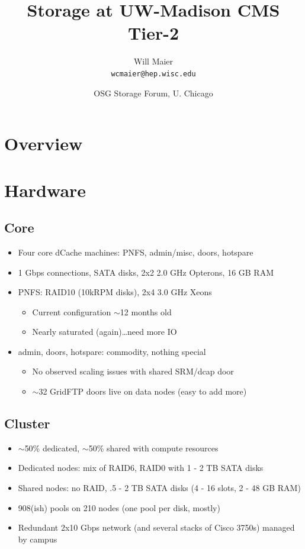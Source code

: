 \documentclass{beamer}
\title{Storage at UW-Madison CMS Tier-2}
\author[Maier]{
    Will Maier \\ 
    {\tt wcmaier@hep.wisc.edu}}
\institute[Wisconsin]{University of Wisconsin - High Energy Physics}
\date[2010.09.22]{OSG Storage Forum, U. Chicago}
\newcommand{\ca}{\ensuremath{\sim}}
\begin{document}

\begin{frame}
    \titlepage
\end{frame}

\section{Overview}
\begin{frame}
    \tableofcontents
\end{frame}

\section{Hardware}
\subsection{Core}
\begin{frame}
\begin{itemize}
	\item Four core dCache machines: PNFS, admin/misc, doors, hotspare
	\item 1 Gbps connections, SATA disks, 2x2 2.0 GHz Opterons, 16 GB RAM
	\item PNFS: RAID10 (10kRPM disks), 2x4 3.0 GHz Xeons
	\begin{itemize}
		\item Current configuration \ca{}12 months old
		\item Nearly saturated (again)\ldots{}need more IO
	\end{itemize}
	\item admin, doors, hotspare: commodity, nothing special
	\begin{itemize}
		\item No observed scaling issues with shared SRM/dcap door
		\item \ca{}32 GridFTP doors live on data nodes (easy to add more)
	\end{itemize}
\end{itemize}
\end{frame}

\subsection{Cluster}
\begin{frame}
\begin{itemize}
	\item \ca{}50\% dedicated, \ca{}50\% shared with compute resources
	\item Dedicated nodes: mix of RAID6, RAID0 with 1 - 2 TB SATA disks
	\item Shared nodes: no RAID, .5 - 2 TB SATA disks (4 - 16 slots, 2 - 48 GB RAM)
	\item 908(ish) pools on 210 nodes (one pool per disk, mostly)
	\item Redundant 2x10 Gbps network (and several stacks of Cisco 3750s) managed by campus
\end{itemize}
\end{frame}
\end{document}
